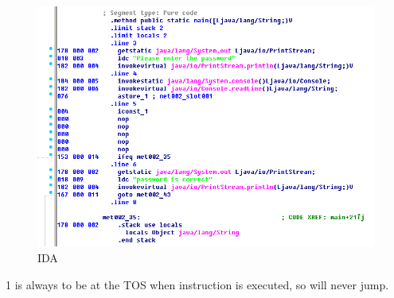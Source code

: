 \begin{figure}[H]
\centering
\includegraphics[scale=\FigScale]{Java_and_NET/java/13_patching/2/3.png}
\caption{IDA}
\end{figure}

1 is always to be at the \ac{TOS} when  instruction is executed, 
so  will never jump.
